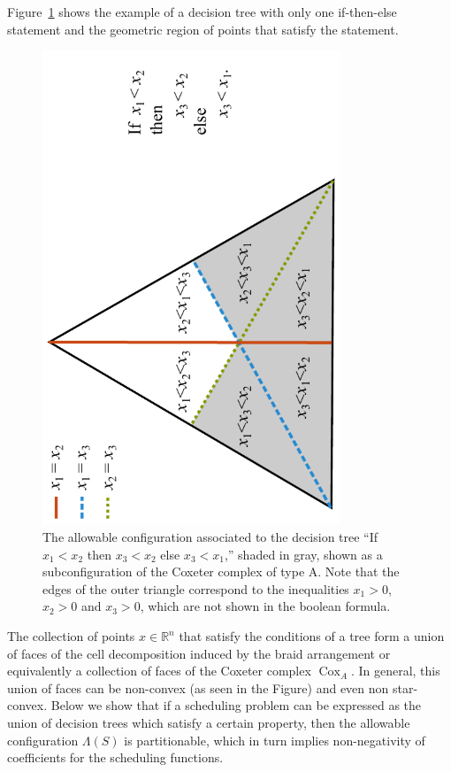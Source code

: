 \documentclass[12pt,reqno]{amsart}
\numberwithin{definition}{section}
\theoremstyle{definition}
\newcommand{\cox}{\operatorname{Cox}}
\newcommand{\allow}{\Lambda} %
\begin{document}
Figure~\ref{fig:tree} shows the example of a decision tree with only one if-then-else statement and the geometric region of points that satisfy the statement.   
\begin{figure}[h]
\includegraphics[angle=270,width=3.5in]{simple_decision_tree}
\caption{The allowable configuration associated to the decision tree ``If $x_1<x_2$ then $x_3<x_2$ else $x_3<x_1$,'' shaded in gray, shown as a subconfiguration of the Coxeter complex of type A. Note that the edges of the outer triangle correspond to the inequalities $x_1>0$, $x_2>0$ and $x_3>0$, which are not shown in the boolean formula.}
\label{fig:tree}
\end{figure}
The collection of points $x \in \mathbb{R}^n$ that satisfy the conditions of a tree form a union of faces of the cell decomposition induced by the braid arrangement or equivalently a collection of faces of the Coxeter complex $\cox_A$.  In general, this union of faces can be non-convex (as seen in the Figure) and even non star-convex.  Below we show that if a scheduling problem can be expressed as the union of decision trees which satisfy a certain property, then the allowable configuration $\allow(S)$ is partitionable, which in turn implies non-negativity of coefficients for the scheduling functions. 
\end{document}
